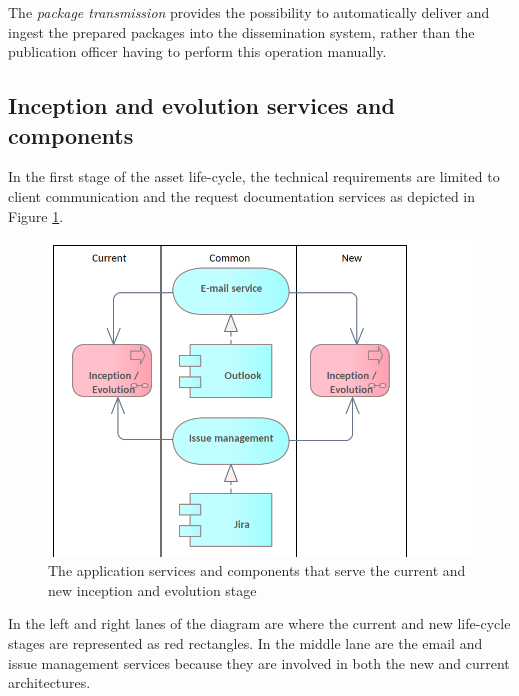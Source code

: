 	The \textit{package transmission} provides the possibility to automatically deliver and ingest the prepared packages into the dissemination system, rather than the publication officer having to perform this operation manually. 
	

	
	\subsection{Inception and evolution services and components}
	\label{sec:evolution-application}
	
	In the first stage of the asset life-cycle, the technical requirements are limited to client communication and the request documentation services as depicted in Figure \ref{fig:application-inception-evolution}.
	
	\begin{figure}[h]
		\centering
		\includegraphics[width=.6\textwidth]{images/application/InceptionEvolution.png}
		\caption{The application services and components that serve the current and new inception and evolution stage}
		\label{fig:application-inception-evolution}
	\end{figure}
	
	In the left and right lanes of the diagram are where the current and new life-cycle stages are represented as red rectangles. In the middle lane are the email and issue management services because they are involved in both the new and current architectures. 
	
